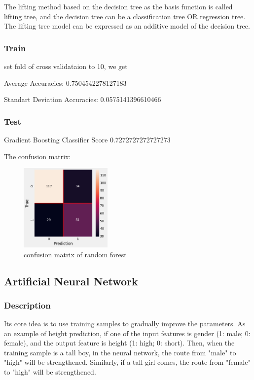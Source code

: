 \documentclass[11pt,en]{elegantpaper}
\begin{document}
The lifting method based on the decision tree as the basis function is called lifting tree, and the decision tree can be a classification tree OR regression tree. The lifting tree model can be expressed as an additive model of the decision tree.


\subsubsection{Train}
set fold of cross validataion to 10, we get

Average Accuracies:  0.7504542278127183

Standart Deviation Accuracies:  0.0575141396610466


\subsubsection{Test}
Gradient Boosting Classifier Score 0.7272727272727273

The confusion matrix:
\begin{figure}[H]
    \centering
    \includegraphics[width=0.4\textwidth]{figure/conmat-gbdt.png}
    \caption{confusion matrix of random forest}
\end{figure}




\subsection{Artificial Neural Network}
\subsubsection{Description}
Its core idea is to use training samples to gradually improve the parameters. As an example of height prediction, if one of the input features is gender (1: male; 0: female), and the output feature is height (1: high; 0: short). Then, when the training sample is a tall boy, in the neural network, the route from "male" to "high" will be strengthened. Similarly, if a tall girl comes, the route from "female" to "high" will be strengthened. 
\end{document}
